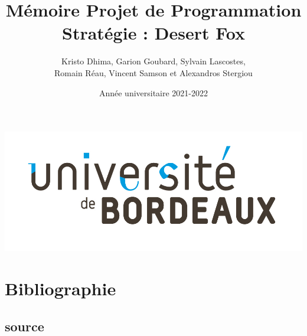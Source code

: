 \documentclass{article}[a4paper, 12pt]
\title{\LARGE \textbf{Mémoire Projet de Programmation  } \\ \Large \textbf{Stratégie : Desert Fox}}
\author{Kristo Dhima, Garion Goubard, Sylvain Lascostes, \\Romain Réau, Vincent Samson et Alexandros Stergiou }
\date{Année universitaire 2021-2022}
\begin{document}
\maketitle
\begin{center}
    \center
    \includegraphics[scale=0.2]{data/Universite_Bordeaux_RVB-10.jpg}

\end{center}





\newpage
\tableofcontents %


\newpage



\newpage


\newpage







\section{Bibliographie}




\subsection{source}


\end{document}
